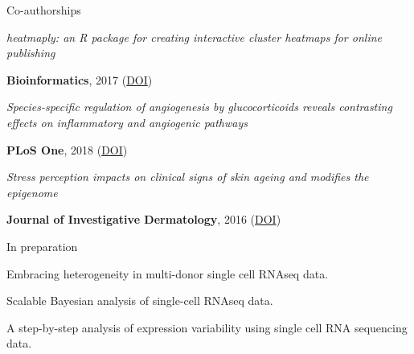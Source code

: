 \begin{cventries}
\cventry
{Co-authorships} %
{} %
{} %
{} %
{ %
    \begin{cvitems}
        \item {
            \begin{flushleft}
                \textit{
                    heatmaply: an R package for creating interactive cluster 
                    heatmaps for online publishing
                }
            \end{flushleft}
            \textbf{Bioinformatics}, 2017
            (\href{https://doi.org/10.1093/bioinformatics/btx657}{DOI})
        }
        \item {
            \begin{flushleft}
                \textit{
                    Species-specific regulation of angiogenesis by 
                    glucocorticoids reveals contrasting effects on inflammatory 
                    and angiogenic pathways
                    } 
            \end{flushleft}
            \textbf{PLoS One}, 2018  
            (\href{https://doi.org/10.1371/journal.pone.0192746}{DOI})
        }
        \item {
            \begin{flushleft}
                \textit{
                    Stress perception impacts on clinical signs of skin ageing 
                    and modifies the epigenome
                }
            \end{flushleft}
            \textbf{Journal of Investigative Dermatology}, 2016
            (\href{http://dx.doi.org/10.1016/j.jid.2016.06.079}{DOI})
        }
    \end{cvitems}
}

\cventry
{In preparation} %
{} %
{} %
{} %
{ %
    \begin{cvitems}
        \item {
            Embracing heterogeneity in multi-donor single cell RNAseq data.
        }
        \item {
            Scalable Bayesian analysis of single-cell RNAseq data.
        }
        \item {
            A step-by-step analysis of expression
            variability using single cell RNA sequencing data.
        }
    \end{cvitems}
}


\end{cventries}
